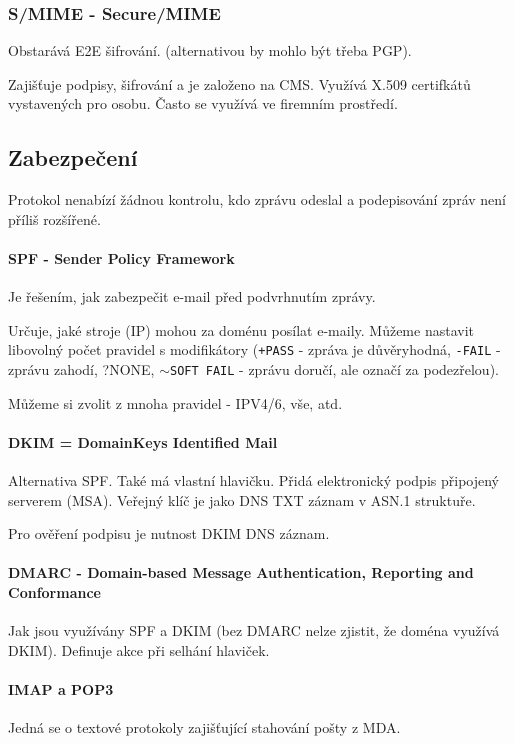 \documentclass[10pt,a4paper]{article}
\begin{document}
\subsubsection*{S/MIME - Secure/MIME}
Obstarává E2E šifrování. (alternativou by mohlo být třeba PGP).

Zajišťuje podpisy, šifrování a je založeno na CMS.
Využívá X.509 certifkátů vystavených pro osobu. Často se využívá ve firemním prostředí.

\subsection{Zabezpečení}

Protokol nenabízí žádnou kontrolu, kdo zprávu odeslal a podepisování zpráv není příliš rozšířené.

\paragraph{SPF - Sender Policy Framework}
Je řešením, jak zabezpečit e-mail před podvrhnutím zprávy.

Určuje, jaké stroje (IP) mohou za doménu posílat e-maily.
Můžeme nastavit libovolný počet pravidel s modifikátory (\texttt{+PASS} - zpráva je důvěryhodná, \texttt{-FAIL} - zprávu zahodí, ?NONE, \texttt{$\sim$SOFT FAIL} - zprávu doručí, ale označí za podezřelou).

Můžeme si zvolit z mnoha pravidel - IPV4/6, vše, atd.

\paragraph{DKIM = DomainKeys Identified Mail}
Alternativa SPF. Také má vlastní hlavičku.
Přidá elektronický podpis připojený serverem (MSA). Veřejný klíč je jako DNS TXT záznam v ASN.1 struktuře.

Pro ověření podpisu je nutnost DKIM DNS záznam.

\paragraph{DMARC - 	Domain-based Message Authentication, Reporting and Conformance}
Jak jsou využívány SPF a DKIM (bez DMARC nelze zjistit, že doména využívá DKIM). Definuje akce při selhání hlaviček. 

\paragraph{IMAP a POP3}
Jedná se o textové protokoly zajišťující stahování pošty z MDA. 
\end{document}
